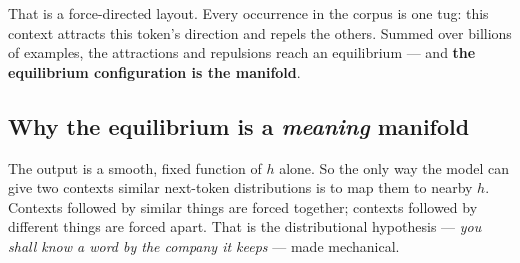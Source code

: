 \documentclass[11pt]{article}
\begin{document}
That is a force-directed layout. Every occurrence in the corpus is one tug: this context
attracts this token's direction and repels the others. Summed over billions of examples,
the attractions and repulsions reach an equilibrium --- and \textbf{the equilibrium
configuration is the manifold}.

\subsection*{Why the equilibrium is a \emph{meaning} manifold}

The output is a smooth, fixed function of $h$ alone. So the only way the model can give
two contexts similar next-token distributions is to map them to nearby $h$. Contexts
followed by similar things are forced together; contexts followed by different things are
forced apart. That is the distributional hypothesis --- \emph{you shall know a word by the
company it keeps} --- made mechanical.
\end{document}
